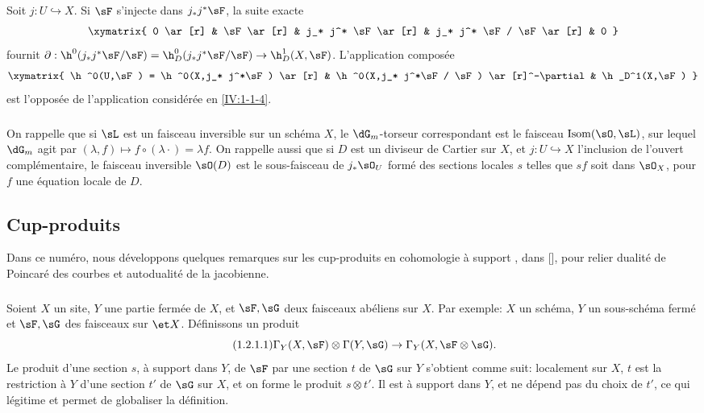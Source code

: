 \marginpar{!}Soit $j:U\hookrightarrow X$. Si $\sF$ s'injecte dans $j_* j^* \sF$, la suite 
exacte 
\[\xymatrix{
  0 \ar[r] 
  & \sF \ar[r]
  & j_* j^* \sF \ar[r]
  & j_* j^* \sF / \sF \ar[r]
  & 0
}\]
fournit 
$\partial:\h^0(j_* j^*\sF/\sF) = \h_D^0(j_* j^* \sF/\sF) \to \h_D^1(X,\sF)$. 
L'application composée 
\[\xymatrix{
  \h^0(U,\sF) = \h^0(X,j_* j^*\sF) \ar[r] 
    & \h^0(X,j_* j^*\sF / \sF) \ar[r]^-\partial 
    & \h_D^1(X,\sF)
}\]
est l'opposée de l'application considérée en \ref{IV:1-1-4}. 





\subsubsection{}\label{IV:1-1-6}

On rappelle que si $\sL$ est un faisceau inversible sur un schéma $X$, le 
$\dG_m$-torseur correspondant est le faisceau $\operatorname{Isom}(\sO,\sL)$, 
sur lequel $\dG_m$ agit par 
$(\lambda,f)\mapsto f\circ (\lambda\cdot) = \lambda f$. On rappelle aussi que 
si $D$ est un diviseur de Cartier sur $X$, et $j:U\hookrightarrow X$ 
l'inclusion de l'ouvert complémentaire, le faisceau inversible $\sO(D)$ est le 
sous-faisceau de $j_*\sO_U$ formé des sections locales $s$ telles que $s f$ 
soit dans $\sO_X$, pour $f$ une équation locale de $D$.










\subsection{Cup-produits}\label{IV:1-2}

Dans ce numéro, nous développons quelques remarques sur les cup-produits en 
cohomologie à support , dans [], pour relier 
dualité de Poincaré des courbes et autodualité de la jacobienne.

\subsubsection{}\label{IV:1-2-1}

Soient $X$ un site, $Y$ une partie fermée de $X$, et $\sF,\sG$ deux faisceaux 
abéliens sur $X$. Par exemple: $X$ un schéma, $Y$ un sous-schéma fermé 
et $\sF,\sG$ des faisceaux sur $\et X$. Définissons un produit 
\begin{equation*}\tag{1.2.1.1}\label{IV:eq:1-2-1-1}
  \Gamma_Y(X,\sF)\otimes \Gamma(Y,\sG) \to \Gamma_Y(X,\sF\otimes\sG) \text{.}
\end{equation*}
Le produit d'une section $s$, à support dans $Y$, de $\sF$ par une section 
$t$ de $\sG$ sur $Y$ s'obtient comme suit: localement sur $X$, $t$ est la 
restriction à $Y$ d'une section $t'$ de $\sG$ sur $X$, et on forme le produit 
$s\otimes t'$. Il est à support dans $Y$, et ne dépend pas du choix de 
$t'$, ce qui légitime et permet de globaliser la définition.

